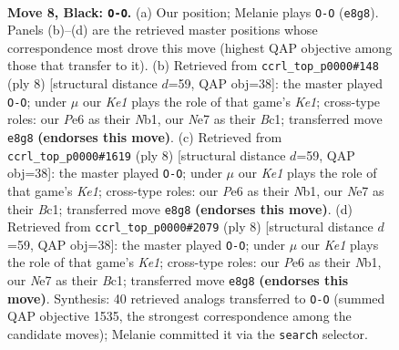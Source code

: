 \documentclass[11pt]{article}
\begin{document}
\begin{figure}[p]\centering
\begin{subfigure}{0.46\textwidth}\centering
\resizebox{\linewidth}{!}{%
\newchessgame
\chessboard[
  setfen={rnb1k2r/pp1qnppp/4p3/2PpP3/7P/P1P5/2P2PP1/R1BQKBNR b KQkq - 0 8},
  showmover=false,
  pgfstyle=straightmove, color=movearrow, markmove={e8-g8}
]}
\caption{}
\end{subfigure}\hfill
\begin{subfigure}{0.46\textwidth}\centering
\resizebox{\linewidth}{!}{%
\newchessgame
\chessboard[
  setfen={r1bqkbnr/1pp2ppp/p1p5/4p3/4P3/5N2/PPPP1PPP/RNBQK2R w KQkq - 0 5},
  showmover=false,
  pgfstyle=straightmove, color=movearrow, markmove={e1-g1}
]}
\caption{}
\end{subfigure}
\\[4pt]
\begin{subfigure}{0.46\textwidth}\centering
\resizebox{\linewidth}{!}{%
\newchessgame
\chessboard[
  setfen={r1bqkbnr/1pp2ppp/p1p5/4p3/4P3/5N2/PPPP1PPP/RNBQK2R w KQkq - 0 5},
  showmover=false,
  pgfstyle=straightmove, color=movearrow, markmove={e1-g1}
]}
\caption{}
\end{subfigure}\hfill
\begin{subfigure}{0.46\textwidth}\centering
\resizebox{\linewidth}{!}{%
\newchessgame
\chessboard[
  setfen={r1bqkbnr/1pp2ppp/p1p5/4p3/4P3/5N2/PPPP1PPP/RNBQK2R w KQkq - 0 5},
  showmover=false,
  pgfstyle=straightmove, color=movearrow, markmove={e1-g1}
]}
\caption{}
\end{subfigure}
\caption{\textbf{Move 8, Black: \texttt{O-O}.} (a) Our position; Melanie plays \texttt{O-O} (\texttt{e8g8}). Panels (b)--(d) are the retrieved master positions whose correspondence most drove this move (highest QAP objective among those that transfer to it). (b) Retrieved from \texttt{ccrl\_top\_p0000\#148} (ply 8) [structural distance $d$=59, QAP obj=38]: the master played \texttt{O-O}; under $\mu$ our \emph{Ke1} plays the role of that game's \emph{Ke1}; cross-type roles: our \emph{P}e6 as their \emph{N}b1, our \emph{N}e7 as their \emph{B}c1; transferred move \texttt{e8g8} \textbf{(endorses this move)}. (c) Retrieved from \texttt{ccrl\_top\_p0000\#1619} (ply 8) [structural distance $d$=59, QAP obj=38]: the master played \texttt{O-O}; under $\mu$ our \emph{Ke1} plays the role of that game's \emph{Ke1}; cross-type roles: our \emph{P}e6 as their \emph{N}b1, our \emph{N}e7 as their \emph{B}c1; transferred move \texttt{e8g8} \textbf{(endorses this move)}. (d) Retrieved from \texttt{ccrl\_top\_p0000\#2079} (ply 8) [structural distance $d$=59, QAP obj=38]: the master played \texttt{O-O}; under $\mu$ our \emph{Ke1} plays the role of that game's \emph{Ke1}; cross-type roles: our \emph{P}e6 as their \emph{N}b1, our \emph{N}e7 as their \emph{B}c1; transferred move \texttt{e8g8} \textbf{(endorses this move)}. Synthesis: 40 retrieved analogs transferred to \texttt{O-O} (summed QAP objective 1535, the strongest correspondence among the candidate moves); Melanie committed it via the \texttt{search} selector.}
\label{fig:thought-m15}
\end{figure}
\end{document}
